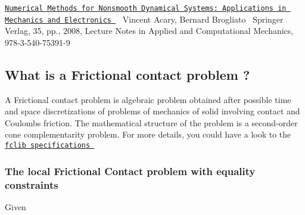 \href{https://hal.inria.fr/inria-00423530}{\tt Numerical Methods for Nonsmooth Dynamical Systems\+: Applications in Mechanics and Electronics }~\newline
 Vincent Acary, Bernard Brogliato~\newline
 Springer Verlag, 35, pp., 2008, Lecture Notes in Applied and Computational Mechanics, 978-\/3-\/540-\/75391-\/9 ~\newline
 ~\newline
 \hypertarget{index_Wahtis}{}\subsection{What is a Frictional contact problem ?}\label{index_Wahtis}
A Frictional contact problem is algebraic problem obtained after possible time and space discretizations of problems of mechanics of solid involving contact and Coulomb\textquotesingle{}s friction. The mathematical structure of the problem is a second-\/order cone complementarity problem. For more details, you could have a look to the \href{https://hal.inria.fr/hal-00945820v2/document}{\tt fclib specifications }\hypertarget{index_Localfclib}{}\subsubsection{The local Frictional Contact problem with equality constraints}\label{index_Localfclib}
Given 
